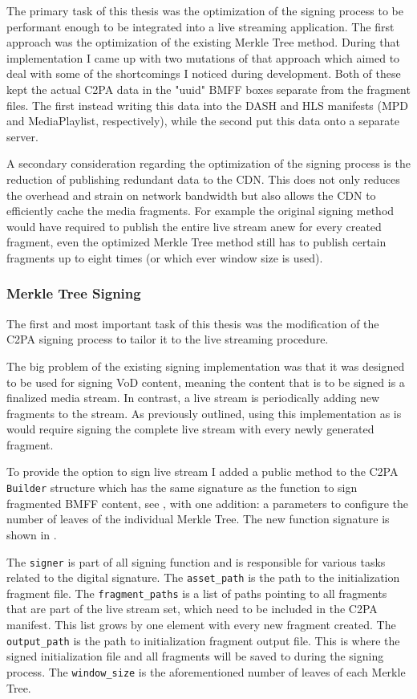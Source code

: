 The primary task of this thesis was the optimization of the signing process to be performant enough to be integrated into a live streaming application. The first approach was the optimization of the existing Merkle Tree method. During that implementation I came up with two mutations of that approach which aimed to deal with some of the shortcomings I noticed during development. Both of these kept the actual C2PA data in the "uuid" BMFF boxes separate from the fragment files. The first instead writing this data into the DASH and HLS manifests (MPD and MediaPlaylist, respectively), while the second put this data onto a separate server. 

A secondary consideration regarding the optimization of the signing process is the reduction of publishing redundant data to the CDN. This does not only reduces the overhead and strain on network bandwidth but also allows the CDN to efficiently cache the media fragments. For example the original signing method would have required to publish the entire live stream anew for every created fragment, even the optimized Merkle Tree method still has to publish certain fragments up to eight times (or which ever window size is used). 

\subsubsection{Merkle Tree Signing\label{sec:merkle_opt}}

The first and most important task of this thesis was the modification of the C2PA signing process to tailor it to the live streaming procedure.

The big problem of the existing signing implementation was that it was designed to be used for signing VoD content, meaning the content that is to be signed is a finalized media stream. In contrast, a live stream is periodically adding new fragments to the stream. As previously outlined, using this implementation as is would require signing the complete live stream with every newly generated fragment.

To provide the option to sign live stream I added a public method to the C2PA \texttt{Builder} structure which has the same signature as the function to sign fragmented BMFF content, see , with one addition: a parameters to configure the number of leaves of the individual Merkle Tree. The new function signature is shown in .

The \texttt{signer} is part of all signing function and is responsible for various tasks related to the digital signature. The \texttt{asset\_path} is the path to the initialization fragment file. The \texttt{fragment\_paths} is a list of paths pointing to all fragments that are part of the live stream set, which need to be included in the C2PA manifest. This list grows by one element with every new fragment created. The \texttt{output\_path} is the path to initialization fragment output file. This is where the signed initialization file and all fragments will be saved to during the signing process. The \texttt{window\_size} is the aforementioned number of leaves of each Merkle Tree. 


